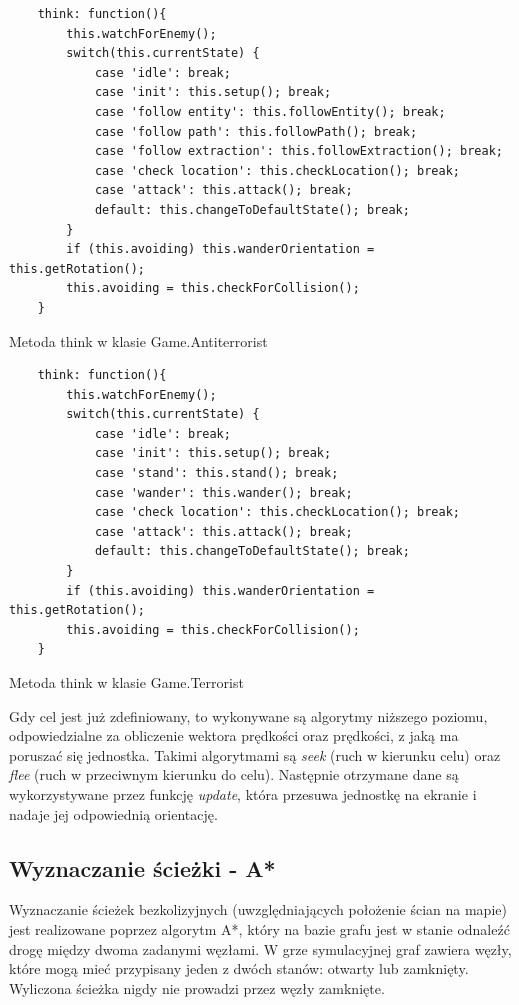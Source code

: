 \begin{table}
\begin{center}
\begin{lstlisting}
    think: function(){
        this.watchForEnemy();
        switch(this.currentState) {
            case 'idle': break;
            case 'init': this.setup(); break;
            case 'follow entity': this.followEntity(); break;
            case 'follow path': this.followPath(); break;
            case 'follow extraction': this.followExtraction(); break;
            case 'check location': this.checkLocation(); break;
            case 'attack': this.attack(); break;
            default: this.changeToDefaultState(); break;
        }
        if (this.avoiding) this.wanderOrientation = this.getRotation();
        this.avoiding = this.checkForCollision();
    }
 \end{lstlisting}
\caption {Metoda think w klasie Game.Antiterrorist}
\label{thinkAt}
\end{center}
\end{table}

\begin{table}
\begin{center}
\begin{lstlisting}
    think: function(){
        this.watchForEnemy();
        switch(this.currentState) {
            case 'idle': break;
            case 'init': this.setup(); break;
            case 'stand': this.stand(); break;
            case 'wander': this.wander(); break;
            case 'check location': this.checkLocation(); break;
            case 'attack': this.attack(); break;
            default: this.changeToDefaultState(); break;
        }
        if (this.avoiding) this.wanderOrientation = this.getRotation();
        this.avoiding = this.checkForCollision();
    }
 \end{lstlisting}
\caption {Metoda think w klasie Game.Terrorist}
\label{thinkTer}
\end{center}
\end{table}

Gdy cel jest już zdefiniowany, to wykonywane są algorytmy niższego poziomu, odpowiedzialne za obliczenie wektora prędkości oraz prędkości, z jaką ma poruszać się jednostka. Takimi algorytmami są \emph{seek} (ruch w kierunku celu) oraz \emph{flee} (ruch w przeciwnym kierunku do celu). Następnie otrzymane dane są wykorzystywane przez funkcję \emph{update}, która przesuwa jednostkę na ekranie i nadaje jej odpowiednią orientację.

\subsection{Wyznaczanie ścieżki - A*}
Wyznaczanie ścieżek bezkolizyjnych (uwzględniających położenie ścian na mapie) jest realizowane poprzez algorytm A*, który na bazie grafu jest w stanie odnaleźć drogę między dwoma zadanymi węzłami. W grze symulacyjnej graf zawiera węzły, które mogą mieć przypisany jeden z dwóch stanów: otwarty lub zamknięty. Wyliczona ścieżka nigdy nie prowadzi przez węzły zamknięte.

